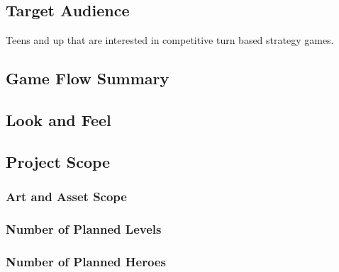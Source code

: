 \subsection{Target Audience}
    \begin{adjustwidth}{1.5em}{0pt}
    Teens and up that are interested in competitive turn based strategy games.
    \end{adjustwidth}

\subsection{Game Flow Summary}

\subsection{Look and Feel}

\subsection{Project Scope}

\subsubsection{Art and Asset Scope}

\subsubsection{Number of Planned Levels}

\subsubsection{Number of Planned Heroes}

\newpage